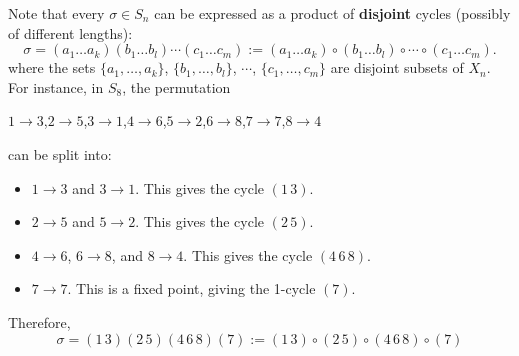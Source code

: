 Note that every $\sigma \in S_n$ can be expressed as a product of {\bf disjoint} cycles (possibly of different lengths):
$$\sigma = (a_1 \dots a_k) (b_1 \dots b_l) \cdots (c_1 \dots c_m) := (a_1 \dots a_k) \circ (b_1 \dots b_l) \circ \cdots \circ(c_1 \dots c_m).$$
where the sets $\{a_1, \dots , a_k\}$, $\{b_1, \dots , b_l\}$, $\cdots$, $\{c_1, \dots , c_m\}$ are disjoint subsets of $X_n$. For instance, in $S_8$, the permutation
\begin{center}
$1 \to 3$,\quad $2 \to 5$,\quad $3 \to 1$,\quad $4 \to 6$,\quad $5 \to 2$,\quad $6 \to 8$,\quad $7 \to 7$,\quad $8 \to 4$ 
\vspace{3mm}
\\
\end{center}
can be split into:
\begin{itemize}
    \item $1 \to 3$ and $3 \to 1$. This gives the cycle $(1 \, 3)$.
    \item $2 \to 5$ and $5 \to 2$. This gives the cycle $(2 \, 5)$.
    \item $4 \to 6$, $6 \to 8$, and $8 \to 4$. This gives the cycle $(4 \, 6 \, 8)$.
    \item $7 \to 7$. This is a fixed point, giving the 1-cycle $(7)$.
\end{itemize}
Therefore,
\[
\sigma = (1 \, 3)(2 \, 5)(4 \, 6 \, 8)(7) := (1 \, 3) \circ (2 \, 5) \circ (4 \, 6 \, 8) \circ (7)
\]

